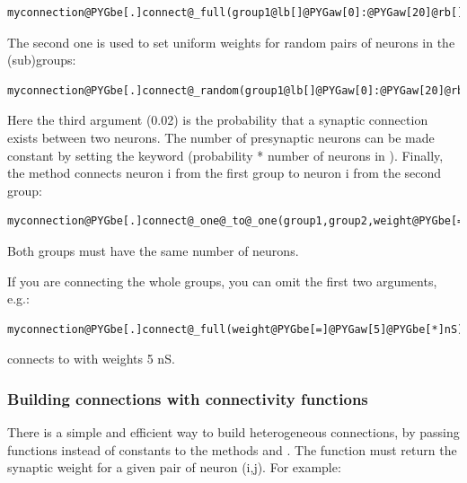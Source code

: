 \documentclass[letterpaper,10pt,english]{manual}
\begin{document}
\begin{Verbatim}[commandchars=@\[\]]
myconnection@PYGbe[.]connect@_full(group1@lb[]@PYGaw[0]:@PYGaw[20]@rb[],group2@lb[]@PYGaw[10]:@PYGaw[40]@rb[],weight@PYGbe[=]@PYGaw[5]@PYGbe[*]nS)
\end{Verbatim}

The second one is used to set uniform weights for random pairs of neurons in the (sub)groups:

\begin{Verbatim}[commandchars=@\[\]]
myconnection@PYGbe[.]connect@_random(group1@lb[]@PYGaw[0]:@PYGaw[20]@rb[],group2@lb[]@PYGaw[10]:@PYGaw[40]@rb[],sparseness@PYGbe[=]@PYGaw[0.02],weight@PYGbe[=]@PYGaw[5]@PYGbe[*]nS)
\end{Verbatim}

Here the third argument (0.02) is the probability that a synaptic connection exists between two neurons.
The number of presynaptic neurons can be made constant by setting the keyword 
(probability * number of neurons in ).
Finally, the method  connects neuron i from the first
group to neuron i from the second group:

\begin{Verbatim}[commandchars=@\[\]]
myconnection@PYGbe[.]connect@_one@_to@_one(group1,group2,weight@PYGbe[=]@PYGaw[3]@PYGbe[*]nS)
\end{Verbatim}

Both groups must have the same number of neurons.

If you are connecting the whole groups, you can omit the first two arguments, e.g.:

\begin{Verbatim}[commandchars=@\[\]]
myconnection@PYGbe[.]connect@_full(weight@PYGbe[=]@PYGaw[5]@PYGbe[*]nS)
\end{Verbatim}

connects  to  with weights 5 nS.


\subsubsection{Building connections with connectivity functions}

There is a simple and efficient way to build heterogeneous connections, by passing functions
instead of constants to the methods  and .
The function must return the synaptic weight for a given pair of neuron (i,j).
For example:
\end{document}
